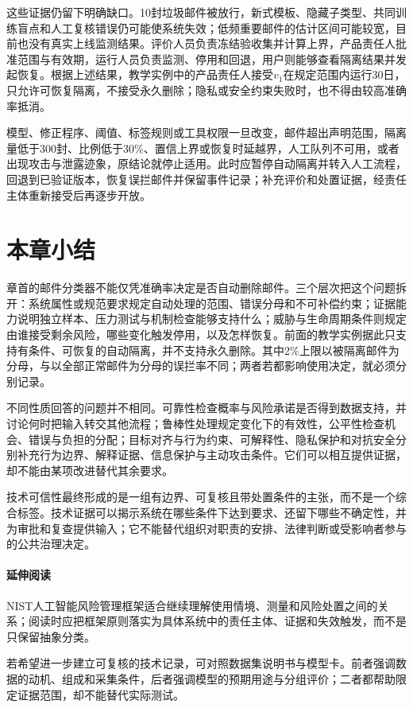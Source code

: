 这些证据仍留下明确缺口。10封垃圾邮件被放行，新式模板、隐藏子类型、共同训练盲点和人工复核错误仍可能使系统失效；低频重要邮件的估计区间可能较宽，目前也没有真实上线监测结果。评价人员负责冻结验收集并计算上界，产品责任人批准范围与有效期，运行人员负责监测、停用和回退，用户则能够查看隔离结果并发起恢复。根据上述结果，教学实例中的产品责任人接受$v_1$在规定范围内运行30日，只允许可恢复隔离，不接受永久删除；隐私或安全约束失败时，也不得由较高准确率抵消。

模型、修正程序、阈值、标签规则或工具权限一旦改变，邮件超出声明范围，隔离量低于300封、比例低于30\%、置信上界或恢复时延越界，人工队列不可用，或者出现攻击与泄露迹象，原结论就停止适用。此时应暂停自动隔离并转入人工流程，回退到已验证版本，恢复误拦邮件并保留事件记录；补充评价和处置证据，经责任主体重新接受后再逐步开放。

\section{本章小结}
\label{sec:trust-foundations-summary}

章首的邮件分类器不能仅凭准确率决定是否自动删除邮件。三个层次把这个问题拆开：系统属性或规范要求规定自动处理的范围、错误分母和不可补偿约束；证据能力说明独立样本、压力测试与机制检查能够支持什么；威胁与生命周期条件则规定由谁接受剩余风险，哪些变化触发停用，以及怎样恢复。前面的教学实例据此只支持有条件、可恢复的自动隔离，并不支持永久删除。其中2\%上限以被隔离邮件为分母，与以全部正常邮件为分母的误拦率不同；两者若都影响使用决定，就必须分别记录。

不同性质回答的问题并不相同。可靠性检查概率与风险承诺是否得到数据支持，并讨论何时把输入转交其他流程；鲁棒性处理规定变化下的有效性，公平性检查机会、错误与负担的分配；目标对齐与行为约束、可解释性、隐私保护和对抗安全分别补充行为边界、解释证据、信息保护与主动攻击条件。它们可以相互提供证据，却不能由某项改进替代其余要求。

技术可信性最终形成的是一组有边界、可复核且带处置条件的主张，而不是一个综合标签。技术证据可以揭示系统在哪些条件下达到要求、还留下哪些不确定性，并为审批和复查提供输入；它不能替代组织对职责的安排、法律判断或受影响者参与的公共治理决定。

\paragraph{延伸阅读}

NIST人工智能风险管理框架适合继续理解使用情境、测量和风险处置之间的关系；阅读时应把框架原则落实为具体系统中的责任主体、证据和失效触发，而不是只保留抽象分类。

若希望进一步建立可复核的技术记录，可对照数据集说明书与模型卡。前者强调数据的动机、组成和采集条件，后者强调模型的预期用途与分组评价；二者都帮助限定证据范围，却不能替代实际测试。
